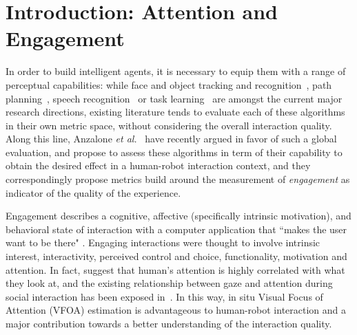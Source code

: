 \documentclass{sig-alternate}
\newcommand{\etal}{\textit{et al.}\xspace}
\begin{document}
\section{Introduction: Attention and Engagement}
%

In order to build intelligent agents, it is necessary to equip them with a range
of perceptual capabilities: while face and object tracking and
recognition~\cite{Zhao:2003, Jafri:2014}, path planning~\cite{Galceran:2013},
speech recognition~\cite{brick2007incremental} or task
learning~\cite{calinon2007learning} are amongst the current major research
directions, existing literature tends to evaluate each of these algorithms in
their own metric space, without considering the overall interaction quality.
Along this line, Anzalone \etal~\cite{anzalone} have recently argued in favor of
such a global evaluation, and propose to assess these algorithms in term of
their capability to obtain the desired effect in a human-robot interaction
context, and they correspondingly propose metrics build around the measurement
of \emph{engagement} as indicator of the quality of the experience.

Engagement describes a cognitive, affective (specifically intrinsic motivation),
and behavioral state of interaction with a computer application that ``makes the
user want to be there" \cite{OBrien:2010}. Engaging interactions were thought to
involve intrinsic interest, interactivity, perceived control and choice,
functionality, motivation and attention. In fact,
\cite{yarbus1967eye,barber1976perception} suggest that human's attention is
highly correlated with what they look at, and the existing relationship between
gaze and attention during social interaction has been exposed
in~\cite{argyle1969social}. In this way, in situ Visual Focus of Attention
(VFOA) estimation is advantageous to human-robot interaction and a major
contribution towards a better understanding of the interaction quality.
\end{document}
